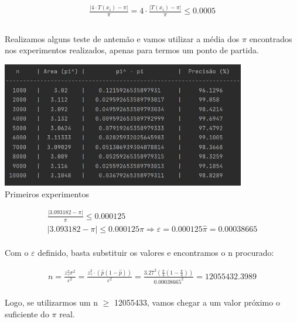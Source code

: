 \documentclass{article}
\begin{document}
    \begin{gather*}
        \frac{|4\cdot T(x_i)-\pi|}{\pi} =
        4\cdot \frac{|T(x_i)-\pi|}{\pi} \le 0.0005 \\
    \end{gather*}

    \paragraph{} Realizamos alguns teste de antemão e vamos utilizar a média dos $\pi$ encontrados nos experimentos realizados, apenas para termos um ponto de partida.

    \begin{center}
        \includegraphics[width=0.8\textwidth]{experimento_inicial}\\
        \caption{Primeiros experimentos}
    \end{center}
    
    \begin{gather*}
        \frac{|3.093182 - \pi|}{\pi} \le 0.000125 \\
        |3.093182 - \pi| \le 0.000125 \pi \Longrightarrow \varepsilon = 0.000125 \widehat{\pi} = 0.00038665
    \end{gather*}

    \paragraph{} Com o $\varepsilon$ definido, basta substituir os valores e encontramos o n procurado:

    \begin{gather*}
        n = \frac{z_\gamma^2 \sigma^2}{\varepsilon^2} = \frac{z_\gamma^2 \cdot (\widehat{p}(1-\widehat{p}))}{\varepsilon^2} = \frac{3.27^2 (\frac{\pi}{4}(1-\frac{\pi}{4}))}{0.00038665^2} = 12055432.3989
    \end{gather*}

    \paragraph{} Logo, se utilizarmos um n $\ge$ 12055433, vamos chegar a um valor próximo o suficiente do $\pi$ real.
\end{document}
